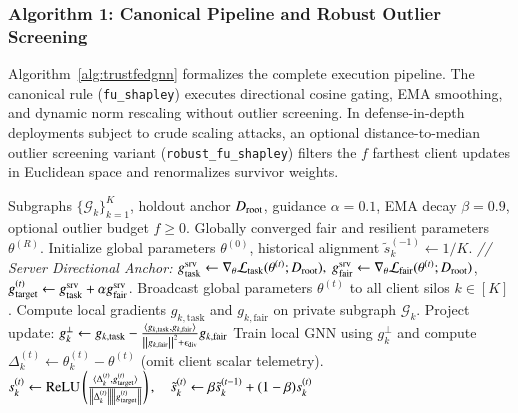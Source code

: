 \subsubsection{Algorithm 1: Canonical Pipeline and Robust Outlier Screening}
Algorithm~\ref{alg:trustfedgnn} formalizes the complete execution pipeline. The canonical rule (\texttt{fu\_shapley}) executes directional cosine gating, EMA smoothing, and dynamic norm rescaling without outlier screening. In defense-in-depth deployments subject to crude scaling attacks, an optional distance-to-median outlier screening variant (\texttt{robust\_fu\_shapley}) filters the $f$ farthest client updates in Euclidean space and renormalizes survivor weights.

\begin{algorithm}[t]
\footnotesize
\caption{\MethodName{}: Server-Anchored Byzantine-Resilient Federated Graph Learning}
\label{alg:trustfedgnn}
\begin{algorithmic}[1]
\REQUIRE Subgraphs $\{\mathcal{G}_k\}_{k=1}^K$, holdout anchor $D_{\mathrm{root}}$, guidance $\alpha = 0.1$, EMA decay $\beta = 0.9$, optional outlier budget $f \ge 0$.
\ENSURE Globally converged fair and resilient parameters $\theta^{(R)}$.
\STATE Initialize global parameters $\theta^{(0)}$, historical alignment $\tilde{s}_k^{(-1)} \gets 1/K$.
    \STATE \textit{// Server Directional Anchor:} $\gtask^{\mathrm{srv}} \gets \nabla_\theta \mathcal{L}_{\mathrm{task}}(\theta^{(t)}; \Droot), \ \gfair^{\mathrm{srv}} \gets \nabla_\theta \mathcal{L}_{\mathrm{fair}}(\theta^{(t)}; \Droot)$, $g_{\mathrm{target}}^{(t)} \gets g_{\mathrm{task}}^{\mathrm{srv}} + \alpha g_{\mathrm{fair}}^{\mathrm{srv}}$.
    \STATE Broadcast global parameters $\theta^{(t)}$ to all client silos $k \in [K]$.
        \STATE Compute local gradients $g_{k,\mathrm{task}}$ and $g_{k,\mathrm{fair}}$ on private subgraph $\mathcal{G}_k$.
        \STATE Project update: $g_k^{\perp} \gets g_{k,\mathrm{task}} - \frac{\langle g_{k,\mathrm{task}}, g_{k,\mathrm{fair}} \rangle}{\left\lVert g_{k,\mathrm{fair}} \right\rVert^2 + \epsilon_{\mathrm{div}}} g_{k,\mathrm{fair}}$ 
        \STATE Train local GNN using $g_k^{\perp}$ and compute $\Delta_k^{(t)} \gets \theta_k^{(t)} - \theta^{(t)}$ (omit client scalar telemetry).
    \ENDFOR
        \STATE $s_k^{(t)} \gets \operatorname{ReLU}\left( \frac{\langle \Delta_k^{(t)}, g_{\mathrm{target}}^{(t)} \rangle}{\left\lVert \Delta_k^{(t)} \right\rVert \left\lVert g_{\mathrm{target}}^{(t)} \right\rVert} \right), \quad \tilde{s}_k^{(t)} \gets \beta \tilde{s}_k^{(t-1)} + (1-\beta) s_k^{(t)}$ 

\end{algorithmic}
\end{algorithm}
